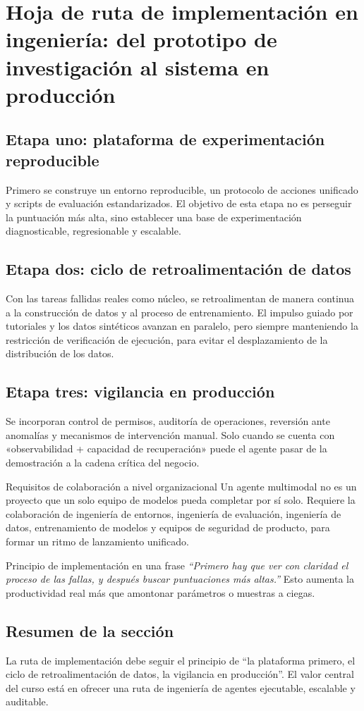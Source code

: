 \section{Hoja de ruta de implementación en ingeniería: del prototipo de investigación al sistema en producción}

\subsection{Etapa uno: plataforma de experimentación reproducible}
Primero se construye un entorno reproducible, un protocolo de acciones unificado y scripts de evaluación estandarizados. El objetivo de esta etapa no es perseguir la puntuación más alta, sino establecer una base de experimentación diagnosticable, regresionable y escalable.

\subsection{Etapa dos: ciclo de retroalimentación de datos}
Con las tareas fallidas reales como núcleo, se retroalimentan de manera continua a la construcción de datos y al proceso de entrenamiento. El impulso guiado por tutoriales y los datos sintéticos avanzan en paralelo, pero siempre manteniendo la restricción de verificación de ejecución, para evitar el desplazamiento de la distribución de los datos.

\subsection{Etapa tres: vigilancia en producción}
Se incorporan control de permisos, auditoría de operaciones, reversión ante anomalías y mecanismos de intervención manual. Solo cuando se cuenta con «observabilidad + capacidad de recuperación» puede el agente pasar de la demostración a la cadena crítica del negocio.

\begin{knowledgebox}{Requisitos de colaboración a nivel organizacional}
Un agente multimodal no es un proyecto que un solo equipo de modelos pueda completar por sí solo. Requiere la colaboración de ingeniería de entornos, ingeniería de evaluación, ingeniería de datos, entrenamiento de modelos y equipos de seguridad de producto, para formar un ritmo de lanzamiento unificado.
\end{knowledgebox}

\begin{importantbox}{Principio de implementación en una frase}
\textit{``Primero hay que ver con claridad el proceso de las fallas, y después buscar puntuaciones más altas.''} Esto aumenta la productividad real más que amontonar parámetros o muestras a ciegas.
\end{importantbox}

\subsection{Resumen de la sección}
La ruta de implementación debe seguir el principio de ``la plataforma primero, el ciclo de retroalimentación de datos, la vigilancia en producción''. El valor central del curso está en ofrecer una ruta de ingeniería de agentes ejecutable, escalable y auditable.

